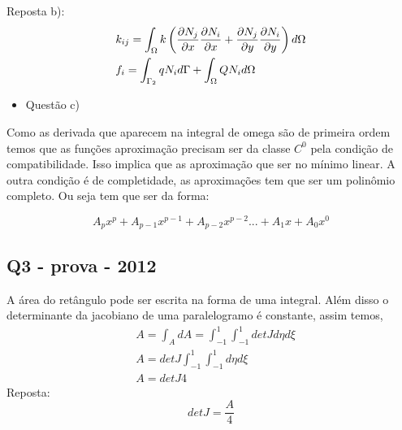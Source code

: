 \color{blue}
Reposta b):
\begin{equation}
	\begin{split}
		&k_{ij} = \int_{\Omega} k \left( \frac{\partial N_j}{\partial x}\frac{\partial N_i}{\partial x} + \frac{\partial N_j}{\partial y}\frac{\partial N_i}{\partial y} \right) d \Omega\\
		&f_{i} = \int_{\Gamma_2} q N_i d\Gamma + \int_{\Omega} Q N_i d \Omega
	\end{split}
\end{equation}
\color{black}
%
\begin{itemize}
	\item Questão c)
\end{itemize}

Como as derivada que aparecem na integral de omega são de primeira ordem temos que as funções aproximação precisam ser da classe $C^0$ pela condição de compatibilidade. Isso implica que as aproximação que ser no mínimo linear. A outra condição é de completidade, as aproximações tem que ser um polinômio completo. Ou seja tem que ser da forma:

\begin{equation}
A_p x^p + A_{p-1} x^{p-1} + A_{p-2}x^{p-2} ... + A_1 x + A_0 x^0
\end{equation}



\subsection{Q3 - prova - 2012}

A área do retângulo pode ser escrita na forma de uma integral. Além disso o determinante da jacobiano de uma paralelogramo é constante, assim temos,
%
\begin{equation}
	\begin{split}
		&A = \int_A dA = \int_{-1}^{1} \int_{-1}^{1} det J d\eta d\xi\\
		&A = det J \int_{-1}^{1} \int_{-1}^{1} d\eta d\xi\\
		&A = det J 4
	\end{split}
\end{equation}
%
\color{blue}
Reposta:
\begin{equation}
	det J = \frac{A}{4}
\end{equation} 
\color{black}
